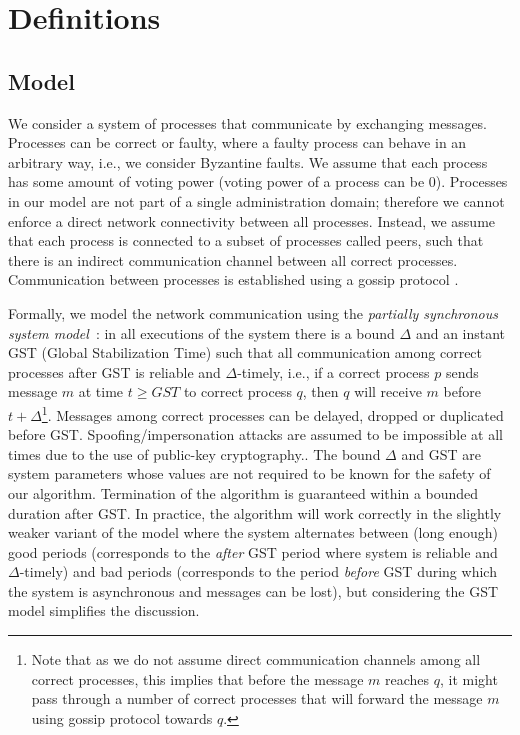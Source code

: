 \section{Definitions} \label{sec:definitions}

\subsection{Model}

We consider a system of processes that communicate by exchanging messages.
Processes can be correct or faulty, where a faulty process can behave in an
arbitrary way, i.e., we consider Byzantine faults. We assume that each process
has some amount of voting power (voting power of a process can be $0$).
Processes in our model are not part of a single administration domain;
therefore we cannot enforce a direct network connectivity between all
processes. Instead, we assume that each process is connected to a subset of
processes called peers, such that there is an indirect communication channel
between all correct processes. Communication between processes is established
using a gossip protocol \cite{Dem1987:gossip}.

Formally, we model the network communication using the \emph{partially
synchronous system model}~\cite{DLS88:jacm}: in all executions of the system
there is a bound $\Delta$ and an instant GST (Global Stabilization Time) such
that all communication among correct processes after GST is reliable and
$\Delta$-timely, i.e., if a correct process $p$ sends message $m$ at time $t
\ge GST$ to correct process $q$, then $q$ will receive $m$ before $t +
\Delta$\footnote{Note that as we do not assume direct communication channels
    among all correct processes, this implies that before the message $m$
    reaches $q$, it might pass through a number of correct processes that will
forward the message $m$ using gossip protocol towards $q$.}. Messages among
correct processes can be delayed, dropped or duplicated before GST.
Spoofing/impersonation attacks are assumed to be impossible at all times due to
the use of public-key cryptography..  The bound $\Delta$ and GST are system
parameters whose values are not required to be known for the safety of our
algorithm. Termination of the algorithm is guaranteed within a bounded duration
after GST.  In practice, the algorithm will work correctly in the slightly
weaker variant of the model where the system alternates between (long enough)
good periods (corresponds to the \emph{after} GST period where system is
reliable and $\Delta$-timely) and bad periods (corresponds to the period
\emph{before} GST during which the system is asynchronous and messages can be
lost), but considering the GST model simplifies the discussion.  


